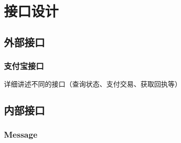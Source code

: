 \chapter{接口设计}
    \section{外部接口}

\subsection{支付宝接口}
详细讲述不同的接口（查询状态、支付交易、获取回执等）

\section{内部接口}
\subsection{Message}

